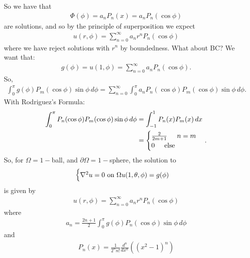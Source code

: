 \documentclass{book}
\theoremstyle{definition}
\newcommand{\p}{\partial}
\newcommand{\f}[2]{\frac{#1}{#2}}
\newcommand{\lp}{\left(}
\newcommand{\rp}{\right)}
\begin{document}
\begin{enumerate}
	So we have that
	\begin{align*}
	\Phi(\phi) = a_nP_n(x) = a_nP_n(\cos\phi)
	\end{align*}
	are solutions, and so by the principle of superposition we expect
	\begin{align*}
	\boxed{u(r,\phi) = \sum^\infty_{n=0}a_nr^nP_n(\cos\phi)}
	\end{align*}
	where we have reject solutions with $r^n$ by boundedness. What about BC? We want that:
	\begin{align*}
	g(\phi) = u(1,\phi) = \sum^\infty_{n=0}a_nP_n(\cos\phi).
	\end{align*}
	So,
	\begin{align*}
	\int^\pi_0 g(\phi)P_m(\cos\phi)\sin\phi\,d\phi =  \sum^\infty_{n=0}  \int^\pi_0 a_nP_n(\cos\phi)P_m(\cos\phi)\sin\phi \,d\phi.
	\end{align*}
	With Rodriguez's Formula:
	\begin{align*}
	\int^\pi_0 P_n(\cos\phi)P_m(\cos\phi)\sin\phi \,d\phi &= 
	\int^{1}_{-1} P_n(x)P_m(x) \,dx\\
	&= \begin{cases}
	\f{2}{2m+1}\hspace{0.5cm} n=m\\
	0\hspace{0.5cm}\text{else}
	\end{cases}.
	\end{align*}
	So, for $\Omega = 1-$ball, and $\p\Omega = 1-$sphere, the solution to 
	\begin{align*}
	\begin{cases}
	\laplacian u = 0 \text{ on }\Omega
	u(1,\theta,\phi) = g(\phi)
	\end{cases}
	\end{align*}
	is given by
	\begin{align*}
	\boxed{u(r,\phi) = \sum^\infty_{n=0} a_nr^nP_n(\cos\phi) }
	\end{align*}
	where
	\begin{align*}
	\boxed{a_n = \f{2n+1}{2}\int^\pi_0 g(\phi)P_n(\cos\phi)\sin\phi\,d\phi }
	\end{align*}
	and
	\begin{align*}
	\boxed{P_n(x) = \f{1}{2^n n!}\f{d^n}{dx^n}\lp (x^2 - 1)^n \rp}
	\end{align*}
\end{enumerate}




\newpage
\end{document}
